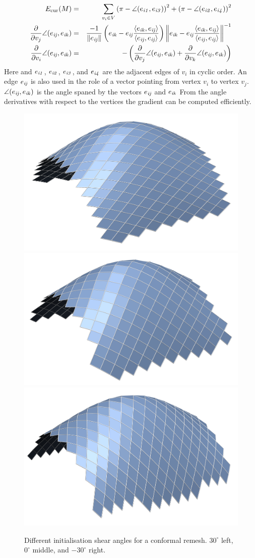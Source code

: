 \begin{eqnarray*}
	E_{\textrm{\scriptsize{cur}}}(M) &=& \sum_{v_i\in V} \left(\pi - \angle(e_{\mathrm{\it{i1}}}, e_{\mathrm{\it{i3}}}) \right)^2 
	+ \left(\pi - \angle(e_{\mathrm{\it{i2}}}, e_{\mathrm{\it{i4}}}) \right)^2 \\
	\frac{\partial}{\partial v_j}\angle(e_{\mathrm{\it{ij}}},e_{\mathrm{\it{ik}}}) &=& 
	\frac{-1}{\left\Vert e_{\mathrm{\it{ij}}}\right\Vert}\left(e_{\mathrm{\it{ik}}}-e_{\mathrm{\it{ij}}}\frac{\left<e_{\mathrm{\it{ik}}},e_{\mathrm{\it{ij}}}\right>}{\left<e_{\mathrm{\it{ij}}},e_{\mathrm{\it{ij}}}\right>}\right)
	\left\Vert e_{\mathrm{\it{ik}}}-e_{\mathrm{\it{ij}}}\frac{\left<e_{\mathrm{\it{ik}}},e_{\mathrm{\it{ij}}}\right>}		
	{\left<e_{\mathrm{\it{ij}}},e_{\mathrm{\it{ij}}}\right>} \right\Vert^{-1} \\
	\frac{\partial}{\partial v_i}\angle(e_{\mathrm{\it{ij}}},e_{\mathrm{\it{ik}}}) &=& 
	- \left(\frac{\partial}{\partial v_j}\angle(e_{\mathrm{\it{ij}}},e_{\mathrm{\it{ik}}}) + 
	\frac{\partial}{\partial v_k}\angle(e_{\mathrm{\it{ij}}},e_{\mathrm{\it{ik}}})\right)
\end{eqnarray*}
Here and $e_{\mathrm{\it{i1}}}$, $e_{\mathrm{\it{i2}}}$, $e_{\mathrm{\it{i3}}}$, and $e_{\mathrm{\it{i4}}}$ are the adjacent edges of $v_i$ in cyclic order. An edge $e_{\mathrm{\it{ij}}}$ is also used in the role of a vector pointing from vertex $v_i$ to vertex $v_j$. $\angle(e_{\mathrm{\it{ij}}},e_{\mathrm{\it{ik}}})$ is the angle spaned by the vectors $e_{\mathrm{\it{ij}}}$ and $e_{\mathrm{\it{ik}}}$  From the angle derivatives with respect to the vertices the gradient can be computed efficiently.

\begin{figure}[ht]
\centering
\includegraphics[width=0.32\linewidth]{images/Initialisation/init60_mesh.png}
\includegraphics[width=0.32\linewidth]{images/Initialisation/init90_mesh.png}
\includegraphics[width=0.32\linewidth]{images/Initialisation/init120_mesh.png}
\caption{Different initialisation shear angles for a conformal remesh. $30^\circ$ left, $0^\circ$ middle, and $-30^\circ$ right.}
\label{fig:initial_grids}
\end{figure}
